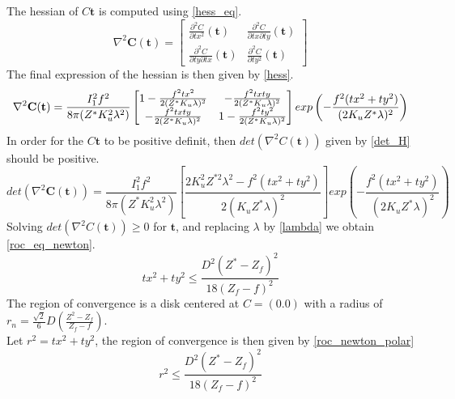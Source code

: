 The hessian of $C{\textbf{t}}$ is computed using \eqref{hess_eq}.
\begin{equation}
    \nabla^{2} \textbf{C}(\textbf{t}) = \begin{bmatrix}
        \frac{\partial^2C}{\partial tx^{2}}(\textbf{t}) & \frac{\partial^2C}{\partial tx \partial ty}(\textbf{t})\\
        \frac{\partial^2C}{\partial ty \partial tx}(\textbf{t}) & \frac{\partial^2C}{\partial ty^{2}}(\textbf{t})
    \end{bmatrix}
    \label{hess_eq}
\end{equation}
The final expression of the hessian is then given by \eqref{hess}.
\begin{equation}
    \nabla^{2} \textbf{C}(\textbf{t}) = \frac{I^{2}_{1}f^{2}}{8\pi(Z^{*}K_{u}^{2}\lambda^{2})}\\
    \begin{bmatrix}
        1-\frac{f^{2}tx^{2}}{2(Z^{*}K_{u}\lambda)^{2}} & -\frac{f^2txty}{2(Z^{*}K_{u}\lambda)^{2}}\\
        -\frac{f^2txty}{2(Z^{*}K_{u}\lambda)^{2}} & 1-\frac{f^{2}ty^{2}}{2(Z^{*}K_{u}\lambda)^{2}}
    \end{bmatrix}exp\left(-\frac{f^{2}(tx^{2}+ty^{2})}{(2K_{u}Z^{*}\lambda)^{2}}\right)  
    \label{hess}
\end{equation}
In order for the $C{\textbf{t}}$ to be positive definit, then $det(\nabla^{2}C(\textbf{t}))$ given by \eqref{det_H} should be positive.
\begin{equation}
        det(\nabla^{2} \textbf{C}(\textbf{t})) = \frac{I^{2}_{1}f^{2}}{8\pi(Z^{*}K_{u}^{2}\lambda^{2})}\left[\frac{2K_{u}^{2}Z^{*2}\lambda^{2}-f^{2}(tx^2+ty^{2})}{2(K_{u}Z^{*}\lambda)^{2}}\right]exp\left(-\frac{f^{2}(tx^{2}+ty^{2})}{(2K_{u}Z^{*}\lambda)^{2}}\right)
    \label{det_H}
\end{equation}
Solving $det(\nabla^{2}C(\textbf{t}))\geq0$ for $\textbf{t}$,  and replacing $\lambda$ by \eqref{lambda} we obtain \eqref{roc_eq_newton}.
\begin{equation}
    tx^{2}+ty^{2} \leq \frac{D^{2}(Z^{*}-Z_{f})^{2}}{18(Z_{f}-f)^{2}}
    \label{roc_eq_newton}
\end{equation}
The region of convergence is a disk centered at $C = (0.0)$ with a radius of $r_{n} = \frac{\sqrt{2}}{6}D\left(\frac{Z^{2}-Z_{f}}{Z_{f}-f}\right)$.\\Let $r^{2} = tx^{2}+ty^{2}$, the region of convergence is then given by \eqref{roc_newton_polar}
\begin{equation}
    r^{2} \leq \frac{D^{2}(Z^{*}-Z_{f})^{2}}{18(Z_{f}-f)^{2}}
    \label{roc_newton_polar}
\end{equation}
